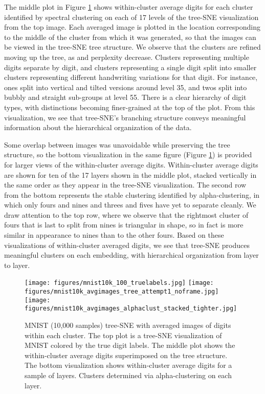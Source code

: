 \documentclass{article}
\begin{document}
The middle plot in Figure \ref{fig:MNIST-hierarchy-example} shows within-cluster average digits for each cluster identified by spectral clustering on each of 17 levels of the tree-SNE visualization from the top image. Each averaged image is plotted in the location corresponding to the middle of the cluster from which it was generated, so that the images can be viewed in the tree-SNE tree structure. We observe that the clusters are refined moving up the tree, as  and perplexity decrease. Clusters representing multiple digits separate by digit, and clusters representing a single digit split into smaller clusters representing different handwriting variations for that digit. For instance, ones split into vertical and tilted versions around level 35, and twos split into bubbly and straight sub-groups at level 55. There is a clear hierarchy of digit types, with distinctions becoming finer-grained at the top of the plot. From this visualization, we see that tree-SNE's branching structure conveys meaningful information about the hierarchical organization of the data.

Some overlap between images was unavoidable while preserving the tree structure, so the bottom visualization in the same figure (Figure \ref{fig:MNIST-hierarchy-example}) is provided for larger views of the within-cluster average digits. Within-cluster average digits are shown for ten of the 17 layers shown in the middle plot, stacked vertically in the same order as they appear in the tree-SNE visualization. The second row from the bottom represents the stable clustering identified by alpha-clustering, in which only fours and nines and threes and fives have yet to separate cleanly. We draw attention to the top row, where we observe that the rightmost cluster of fours that is last to split from nines is triangular in shape, so in fact is more similar in appearance to nines than to the other fours. Based on these visualizations of within-cluster averaged digits, we see that tree-SNE produces meaningful clusters on each embedding, with hierarchical organization from layer to layer.

\begin{figure}[H]
    \centering
    \captionsetup{width=.9\linewidth}
    \texttt{[image: figures/mnist10k\_100\_truelabels.jpg]}
\texttt{[image: figures/mnist10k\_avgimages\_tree\_attempt1\_noframe.jpg]}
    \texttt{[image: figures/mnist10k\_avgimages\_alphaclust\_stacked\_tighter.jpg]}
\caption{MNIST (10,000 samples) tree-SNE with averaged images of digits within each cluster. The top plot is a tree-SNE visualization of MNIST colored by the true digit labels. The middle plot shows the within-cluster average digits superimposed on the tree structure. The bottom visualization shows within-cluster average digits for a sample of layers. Clusters determined via alpha-clustering on each layer.}
    \label{fig:MNIST-hierarchy-example}
\end{figure}
\end{document}
